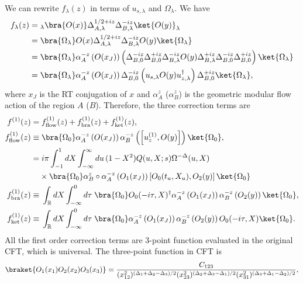 \documentclass[a4paper,11pt]{article}
\theoremstyle{definition}
\theoremstyle{remark}
\begin{document}
We can rewrite $f_\lambda(z)$ in terms of $u_{s,\lambda}$ and $\Omega_\lambda$. We have
\begin{align}
    f_\lambda(z) =&\;_\lambda\bra{O(x)}\Delta_{A,\lambda}^{1/2+iz}\Delta_{B,\lambda}^{-iz}\ket{O(y)}_\lambda \\
    =&\;\bra{\Omega_\lambda}O(x) \Delta_{A,\lambda}^{1/2+iz}\Delta_{B,\lambda}^{-iz}O(y) \ket{\Omega_\lambda}\\
    =& \; \bra{ \Omega_\lambda} \alpha_{A}^{-z}\left(O(x_J)\right) \left( \Delta_{B,0}^{-iz}\Delta_{B,0}^{+iz} \Delta_{B,\lambda}^{-iz}O(y) \Delta_{B,\lambda}^{+iz}\Delta_{B,0}^{-iz}\Delta_{B,0}^{+iz}\right)\ket{\Omega_\lambda}\\
    =& \; \bra{\Omega_\lambda}\alpha_{A}^{-z}\left(O(x_J)\right) \Delta_{B,0}^{-iz}\left(u_{s,\lambda}O(y) u_{z,\lambda}^\dagger\right) \Delta_{B,0}^{+iz}\ket{\Omega_\lambda},
\end{align}
where $x_J$ is the RT conjugation of $x$ and $\alpha_{A}^{z}$ ($\alpha_{B}^{z}$) is the geometric modular flow action of the region $A$ ($B$). Therefore, the three correction terms are
\begin{align}
    f^{(1)}(z) =&\; f^{(1)}_{\text{flow}}(z) + f^{(1)}_{\text{bra}}(z) + f^{(1)}_{\text{ket}}(z),\\
    f^{(1)}_{\text{flow}}(z) \equiv&\; \bra{\Omega_0} \alpha_{A}^{-z}\left(O(x_J)\right) \alpha_{B}^{-z}\left(\left[u_{z}^{(1)},O(y)\right]\right) \ket{\Omega_0}, \\
    =&\; i\pi  \int_{-1}^1 dX \int_{-\infty}^{\infty} du \, (1-X^2)Q(u,X;s) \Omega^{-\Delta}(u,X) \nonumber\\
    &\times\bra{\Omega_0} \alpha_{B}^{z} \circ \alpha_{A}^{-z}\left(O_1(x_J)\right) \left[O_0(t_u,X_u),O_2(y)\right] \ket{\Omega_0} \\
    f^{(1)}_{\text{bra}}(z) \equiv&\; \int_\mathbb{R} dX \int_{-\infty}^{0} d\tau \; \bra{\Omega_0} O_0(-i\tau,X)^\dagger  \alpha_{A}^{-z}\left(O_1(x_J)\right) \alpha_{B}^{-z}\left(O_2(y)\right) \ket{\Omega_0},\\
    f^{(1)}_{\text{ket}}(z) \equiv&\; \int_\mathbb{R} dX \int_{-\infty}^{0} d\tau \; \bra{\Omega_0} \alpha_{A}^{-z}\left(O_1(x_J)\right) \alpha_{B}^{-z}\left(O_2(y)\right) O_0(-i\tau,X) \ket{\Omega_0}.
\end{align}
All the first order correction terms are 3-point function evaluated in the original CFT, which is universal. The three-point function in CFT is \cite{}
\begin{align}
    \braket{O_1(x_1) O_2(x_2) O_3(x_3)} = \frac{C_{123}}{(x_{12}^2)^{(\Delta_1+\Delta_2-\Delta_3)/2}(x_{23}^2)^{(\Delta_2+\Delta_3-\Delta_1)/2}(x_{31}^2)^{(\Delta_3+\Delta_1-\Delta_2)/2}},    
\end{align}
\end{document}
